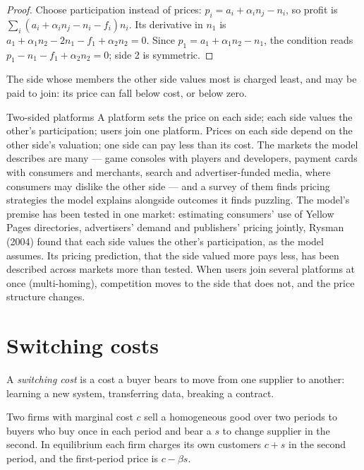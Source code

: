 \begin{proof}
Choose participation instead of prices: $p_i = a_i + \alpha_i n_j - n_i$, so profit is $\sum_i (a_i + \alpha_i n_j - n_i - f_i)n_i$. Its
derivative in $n_1$ is $a_1 + \alpha_1 n_2 - 2n_1 - f_1 + \alpha_2 n_2 = 0$. Since $p_1 = a_1 + \alpha_1 n_2 - n_1$, the condition reads $p_1 - n_1 - f_1 + \alpha_2 n_2 = 0$; side 2
is symmetric.
\end{proof}

The side whose members the other side values most is charged least, and may be
paid to join: its price can fall below cost, or below zero.

\begin{model}{Two-sided platforms}
\assumes A platform sets the price on each side; each side values the other's
participation; users join one platform.
\predicts Prices on each side depend on the other side's valuation; one side can pay
less than its cost.
\tested The markets the model describes are many --- game consoles with players and
developers, payment cards with consumers and merchants, search and advertiser-funded
media, where consumers may dislike the other side --- and a survey of them finds
pricing strategies the model explains alongside outcomes it finds puzzling. %
The model's premise has been tested in one market: estimating consumers' use of
Yellow Pages directories, advertisers' demand and publishers' pricing jointly,
Rysman (2004) found that each side values the other's participation, as the
model assumes. %
Its pricing prediction, that the side valued more pays less, has been described
across markets more than tested.
\breaks When users join several platforms at once (multi-homing), competition moves
to the side that does not, and the price structure changes.
\end{model}

\section{Switching costs}\label{sec:b3:platforms-and-innovation:switching}

\begin{definition}\label{def:b3:platforms-and-innovation:switching}
A \emph{switching cost} is a cost a buyer bears to move from one supplier to another:
learning a new system, transferring data, breaking a contract.
\end{definition}

\begin{proposition}\label{prop:b3:platforms-and-innovation:switching}
Two firms with marginal cost $c$ sell a homogeneous good over two periods to buyers who buy
once in each period and bear a  $s$ to change supplier in the second. In
equilibrium each firm charges its own customers $c + s$ in the second period, and the first-period
price is $c - \beta s$.
\end{proposition}


